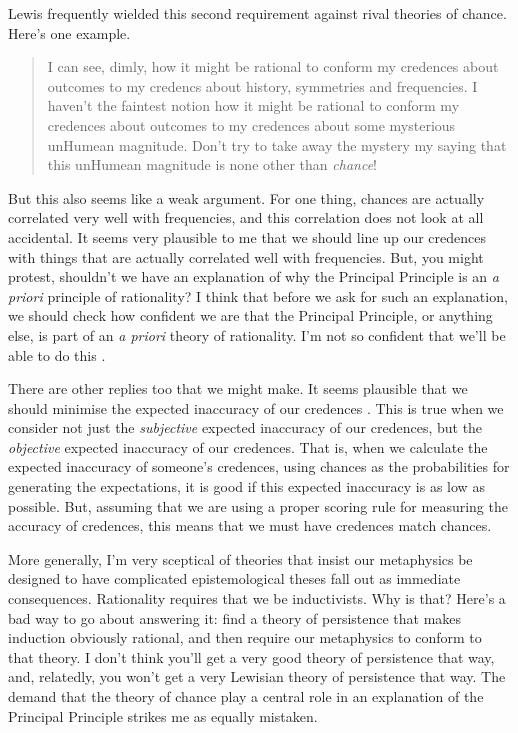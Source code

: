 \noindent Lewis frequently wielded this second requirement against rival theories of chance. Here's one example.

\begin{quote}
I can see, dimly, how it might be rational to conform my credences about outcomes to my credencs about history, symmetries and frequencies. I haven't the faintest notion how it might be rational to conform my credences about outcomes to my credences about some mysterious unHumean magnitude. Don't try to take away the mystery my saying that this unHumean magnitude is none other than \textit{chance}! \citep[xv]{Lewis1986b}
\end{quote}

\noindent But this also seems like a weak argument. For one thing, chances are actually correlated very well with frequencies, and this correlation does not look at all accidental. It seems very plausible to me that we should line up our credences with things that are actually correlated well with frequencies. But, you might protest, shouldn't we have an explanation of why the Principal Principle is an \textit{a priori} principle of rationality? I think that before we ask for such an explanation, we should check how confident we are that the Principal Principle, or anything else, is part of an \textit{a priori} theory of rationality. I'm not so confident that we'll be able to do this \citep{WeathersonSRE, Weatherson2007}.

There are other replies too that we might make. It seems plausible that we should minimise the expected inaccuracy of our credences \citep{Joyce1998}. This is true when we consider not just the \textit{subjective} expected inaccuracy of our credences, but the \textit{objective} expected inaccuracy of our credences. That is, when we calculate the expected inaccuracy of someone's credences, using chances as the probabilities for generating the expectations, it is good if this expected inaccuracy is as low as possible. But, assuming that we are using a proper scoring rule for measuring the accuracy of credences, this means that we must have credences match chances.

More generally, I'm very sceptical of theories that insist our metaphysics be designed to have complicated epistemological theses fall out as immediate consequences. Rationality requires that we be inductivists. Why is that? Here's a bad way to go about answering it: find a theory of persistence that makes induction obviously rational, and then require our metaphysics to conform to that theory. I don't think you'll get a very good theory of persistence that way, and, relatedly, you won't get a very Lewisian theory of persistence that way. The demand that the theory of chance play a central role in an explanation of the Principal Principle strikes me as equally mistaken.

